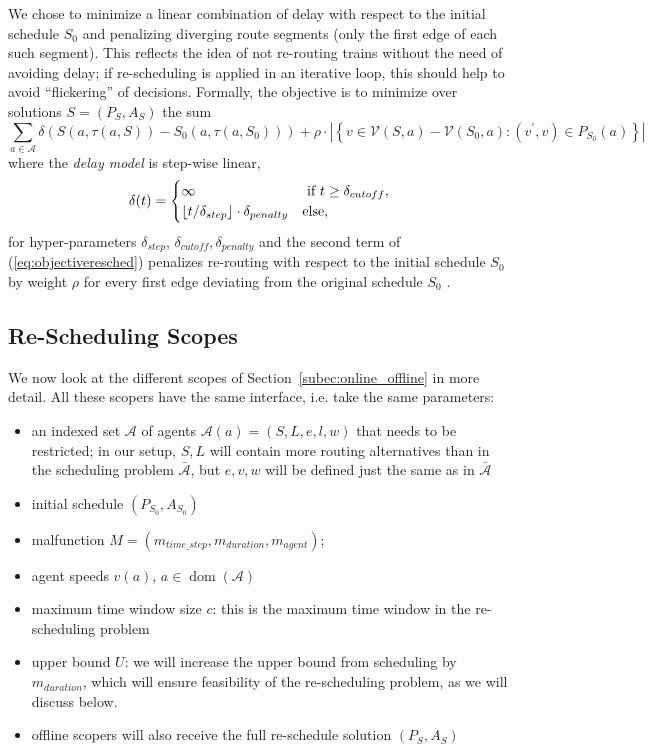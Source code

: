 \documentclass{article}
\DeclareMathOperator{\dom}{dom}
\DeclarePairedDelimiter{\floor}{\lfloor}{\rfloor}
\begin{document}
We chose to minimize a linear combination of delay with respect to the initial schedule $S_0$ and penalizing diverging route segments (only the first edge of each such segment). This reflects the idea of not re-routing trains without the need of avoiding delay; if re-scheduling is applied in an iterative loop, this should help to avoid ``flickering'' of decisions.
%
Formally, the objective is to minimize over solutions $S=(P_S,A_S)$  the sum
\begin{equation}
\sum_{a \in \mathcal{A}} \delta\left(S(a,\tau(a,S)) - S_0(a,\tau(a, S_0))\right) + \rho \cdot \left|\left\{v \in \mathcal{V}(S,a)-\mathcal{V}(S_0,a): (v^\prime,v) \in P_{S_0}(a) \right\}\right| \label{eq:objectiveresched}
\end{equation}
where the \emph{delay model} is step-wise linear,
\begin{equation}
\delta(t) =
\begin{cases}
    \infty & \textrm{ if } t \geq \delta_{cutoff},\\
    \floor{t / \delta_{step}} \cdot \delta_{penalty}  & \textrm{else},
\end{cases}
\end{equation}
for hyper-parameters $\delta_{step}$, $\delta_{cutoff}, \delta_{penalty}$
and the second term of (\ref{eq:objectiveresched}) penalizes re-routing with respect to the initial schedule $S_0$ by weight $\rho$ for every first edge deviating from the original schedule $S_0$ .


\subsection{Re-Scheduling Scopes}\label{subsec:scopers}

We now look at the different scopes of Section~\ref{subec:online_offline} in more detail. All these scopers have the same interface, i.e. take the same parameters:
\begin{itemize}
    \item an indexed set $\mathcal{A}$ of agents $\mathcal{A}(a)=(S,L,e,l,w)$ that needs to be restricted; in our setup, $S,L$ will contain more routing alternatives than in the scheduling problem $\bar{\mathcal{A}}$, but $e,v,w$ will be defined just the same as in $\bar{\mathcal{A}}$
    \item initial schedule $(P_{S_0},A_{S_0})$
    \item malfunction $M=(m_{time\_step},m_{duration},m_{agent})$;
    \item agent speeds $v(a)$, $a \in \dom(\mathcal{A})$
    \item maximum time window size $c$: this is the maximum time window in the re-scheduling problem
    \item upper bound $U$: we will increase the upper bound from scheduling by $m_{duration}$, which will ensure feasibility of the re-scheduling problem, as we will discuss below.
    \item offline scopers will also receive the full re-schedule solution $(P_S,A_S)$
\end{itemize}
\end{document}
